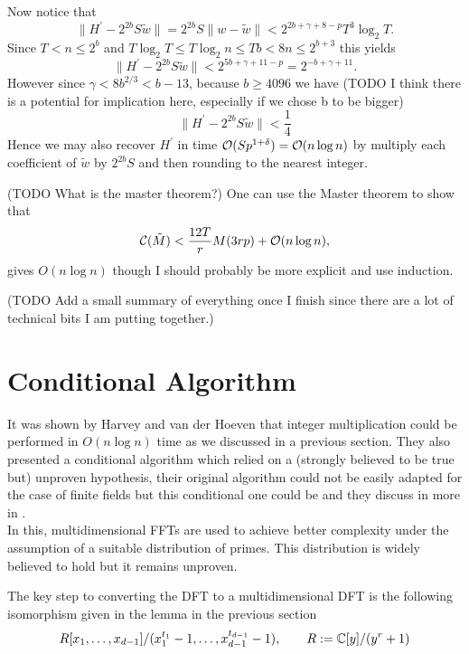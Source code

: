 Now notice that
\[
    \|H^\prime - 2^{2b}S\tilde{w}\| = 2^{2b}S\|w - \tilde{w}\| < 2^{2b + \gamma + 8 - p} T^3 \log_2 T.
\]
Since $T < n \le 2^b$ and $T \log _2 T \le T \log_2 n \le Tb < 8n \le 2^{b+3}$ this yields
\[
    \|H^\prime - 2^{2b}S\tilde{w}\| < 2^{5b + \gamma + 11 - p} = 2^{-b + \gamma + 11}.
\]
However since $\gamma < 8b^{2/3} < b - 13$, because $b \ge 4096$ we have (TODO I think there is a potential for implication here, especially if we chose b to be bigger)
\[
    \| H^\prime - 2^{2b}S \tilde{w} \| < \frac{1}{4}
\]
Hence we may also recover $H^\prime$ in time $\mathcal O(Sp^{1 + \delta}) = \mathcal O(n \log n)$ by multiply each coefficient of $\tilde{w}$ by $2^{2b}S$ and then rounding to the nearest integer.

(TODO What is the master theorem?)
One can use the Master theorem to show that
    \[
        \mathcal C(\tilde{M}) < \frac{12T}{r} M(3rp) + \mathcal O(n \log n),
    \]
gives $O(n \log n)$ though I should probably be more explicit and use induction.

(TODO Add a small summary of everything once I finish since there are a lot of technical bits I am putting together.)

\newpage

\section{Conditional Algorithm}

It was shown by Harvey and van der Hoeven \cite{nlogn} that integer multiplication could be performed in $O(n\log n)$ time as we discussed in a previous section. They also presented a conditional algorithm which relied on a (strongly believed to be true but) unproven hypothesis, their original algorithm could not be easily adapted for the case of finite fields but this conditional one could be and they discuss in more in \cite{ffnlogn}.\\
In this, multidimensional FFTs are used to achieve better complexity under the assumption of a suitable distribution of primes. This distribution is widely believed to hold but it remains unproven.

The key step to converting the DFT to a multidimensional DFT is the following isomorphism given in the lemma in the previous section
\begin{equation}\label{eq:here}
    R[x_1, \ldots, x_{d-1}] / (x_1^{t_1} - 1, \ldots, x_{d-1}^{t_{d-1}} - 1), \qquad R := {\mathbb C}[y]/(y^r + 1)
\end{equation}

